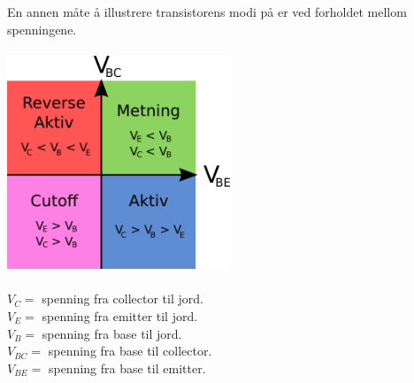 En annen måte å illustrere transistorens modi på
er ved forholdet mellom spenningene.
\\\\
\includegraphics[width=0.5\textwidth]{./img/modi-kvadrant}
\\\\
$V_C = $ spenning fra collector til jord. \\
$V_E = $ spenning fra emitter til jord. \\
$V_B = $ spenning fra base til jord. \\
$V_{BC} = $ spenning fra base til collector. \\
$V_{BE} = $ spenning fra base til emitter. \\
